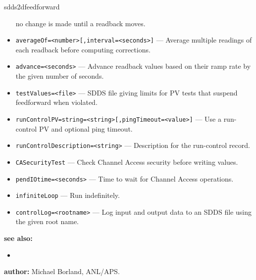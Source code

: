 \begin{sddsprog}{sdds2dfeedforward}
\begin{itemize}
               no change is made until a readback moves.
  \item {\tt averageOf=<number>[,interval=<seconds>]} --- Average multiple
               readings of each readback before computing corrections.
  \item {\tt advance=<seconds>} --- Advance readback values based on their
               ramp rate by the given number of seconds.
  \item {\tt testValues=<file>} --- SDDS file giving limits for PV tests that
               suspend feedforward when violated.
  \item {\tt runControlPV=string=<string>[,pingTimeout=<value>]} --- Use a
               run-control PV and optional ping timeout.
  \item {\tt runControlDescription=<string>} --- Description for the
               run-control record.
  \item {\tt CASecurityTest} --- Check Channel Access security before
               writing values.
  \item {\tt pendIOtime=<seconds>} --- Time to wait for Channel Access
               operations.
  \item {\tt infiniteLoop} --- Run indefinitely.
  \item {\tt controlLog=<rootname>} --- Log input and output data to an
               SDDS file using the given root name.
\end{itemize}
\item \textbf{see also:}
\begin{itemize}
  \item {}
\end{itemize}
\item \textbf{author:} Michael Borland, ANL/APS.
\end{sddsprog}
